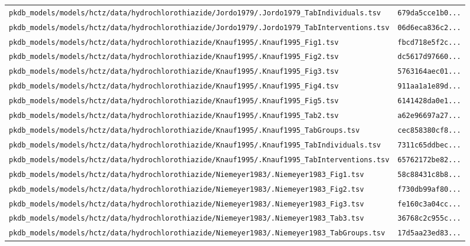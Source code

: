 \documentclass{article}
\begin{document}
\begin{longtable}{ll}
\texttt{pkdb\_models/models/hctz/data/hydrochlorothiazide/Jordo1979/.Jordo1979\_TabIndividuals.tsv} & \texttt{679da5cce1b0...} \\
\texttt{pkdb\_models/models/hctz/data/hydrochlorothiazide/Jordo1979/.Jordo1979\_TabInterventions.tsv} & \texttt{06d6eca836c2...} \\
\texttt{pkdb\_models/models/hctz/data/hydrochlorothiazide/Knauf1995/.Knauf1995\_Fig1.tsv} & \texttt{fbcd718e5f2c...} \\
\texttt{pkdb\_models/models/hctz/data/hydrochlorothiazide/Knauf1995/.Knauf1995\_Fig2.tsv} & \texttt{dc5617d97660...} \\
\texttt{pkdb\_models/models/hctz/data/hydrochlorothiazide/Knauf1995/.Knauf1995\_Fig3.tsv} & \texttt{5763164aec01...} \\
\texttt{pkdb\_models/models/hctz/data/hydrochlorothiazide/Knauf1995/.Knauf1995\_Fig4.tsv} & \texttt{911aa1a1e89d...} \\
\texttt{pkdb\_models/models/hctz/data/hydrochlorothiazide/Knauf1995/.Knauf1995\_Fig5.tsv} & \texttt{6141428da0e1...} \\
\texttt{pkdb\_models/models/hctz/data/hydrochlorothiazide/Knauf1995/.Knauf1995\_Tab2.tsv} & \texttt{a62e96697a27...} \\
\texttt{pkdb\_models/models/hctz/data/hydrochlorothiazide/Knauf1995/.Knauf1995\_TabGroups.tsv} & \texttt{cec858380cf8...} \\
\texttt{pkdb\_models/models/hctz/data/hydrochlorothiazide/Knauf1995/.Knauf1995\_TabIndividuals.tsv} & \texttt{7311c65ddbec...} \\
\texttt{pkdb\_models/models/hctz/data/hydrochlorothiazide/Knauf1995/.Knauf1995\_TabInterventions.tsv} & \texttt{65762172be82...} \\
\texttt{pkdb\_models/models/hctz/data/hydrochlorothiazide/Niemeyer1983/.Niemeyer1983\_Fig1.tsv} & \texttt{58c88431c8b8...} \\
\texttt{pkdb\_models/models/hctz/data/hydrochlorothiazide/Niemeyer1983/.Niemeyer1983\_Fig2.tsv} & \texttt{f730db99af80...} \\
\texttt{pkdb\_models/models/hctz/data/hydrochlorothiazide/Niemeyer1983/.Niemeyer1983\_Fig3.tsv} & \texttt{fe160c3a04cc...} \\
\texttt{pkdb\_models/models/hctz/data/hydrochlorothiazide/Niemeyer1983/.Niemeyer1983\_Tab3.tsv} & \texttt{36768c2c955c...} \\
\texttt{pkdb\_models/models/hctz/data/hydrochlorothiazide/Niemeyer1983/.Niemeyer1983\_TabGroups.tsv} & \texttt{17d5aa23ed83...} \\

\end{longtable}
\end{document}
